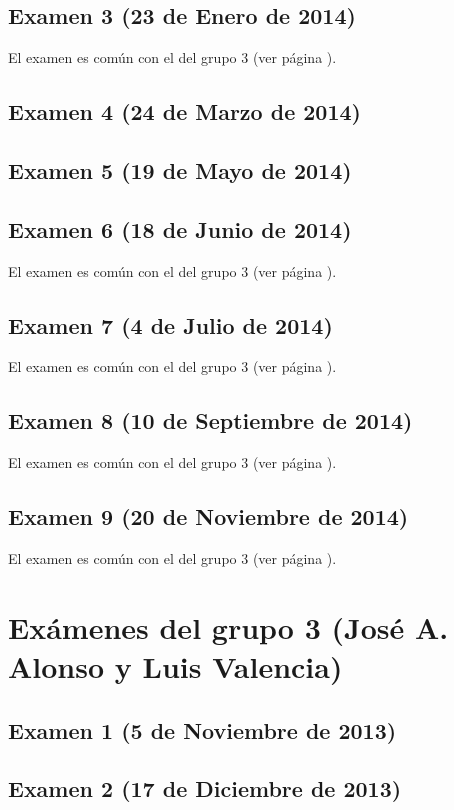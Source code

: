 \documentclass[a4paper,12pt,twoside]{book}
\begin{document}
\subsection{Examen 3 (23 de Enero de 2014)}
El examen es común con el del grupo 3 (ver página \pageref{examen_13_14_3_3}). 
\subsection{Examen 4 (24 de Marzo de 2014)}
\subsection{Examen 5 (19 de Mayo de 2014)}
\subsection{Examen 6 (18 de Junio de 2014)}
El examen es común con el del grupo 3 (ver página \pageref{examen_13_14_3_6}). 
\subsection{Examen 7 (4 de Julio de 2014)}
El examen es común con el del grupo 3 (ver página \pageref{examen_13_14_3_7}). 
\subsection{Examen 8 (10 de Septiembre de 2014)}
El examen es común con el del grupo 3 (ver página \pageref{examen_13_14_3_8}). 
\subsection{Examen 9 (20 de Noviembre de 2014)}
El examen es común con el del grupo 3 (ver página \pageref{examen_13_14_3_9}). 

\section{Exámenes del grupo 3 (José A. Alonso y Luis Valencia)}
\subsection{Examen 1 (5 de Noviembre de 2013)}
\subsection{Examen 2 (17 de Diciembre de 2013)}
\end{document}
